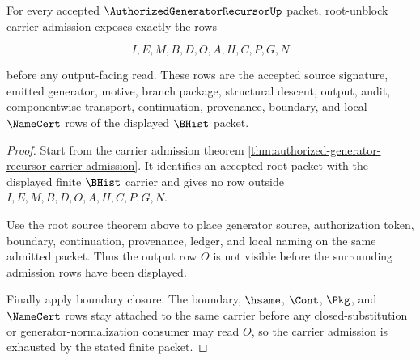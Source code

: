 \begin{theorem}
\label{thm:authorized-generator-recursor-root-unblock-carrier-admission}
For every accepted $\AuthorizedGeneratorRecursorUp$ packet, root-unblock carrier admission exposes exactly the rows

$$
I,E,M,B,D,O,A,H,C,P,G,N
$$

before any output-facing read. These rows are the accepted source signature, emitted generator, motive, branch package, structural descent, output, audit, componentwise transport, continuation, provenance, boundary, and local $\NameCert$ rows of the displayed $\BHist$ packet.
\end{theorem}
\begin{proof}
Start from the carrier admission theorem \autoref{thm:authorized-generator-recursor-carrier-admission}. It identifies an accepted root packet with the displayed finite $\BHist$ carrier and gives no row outside $I,E,M,B,D,O,A,H,C,P,G,N$.

Use the root source theorem above to place generator source, authorization token, boundary, continuation, provenance, ledger, and local naming on the same admitted packet. Thus the output row $O$ is not visible before the surrounding admission rows have been displayed.

Finally apply boundary closure. The boundary, $\hsame$, $\Cont$, $\Pkg$, and $\NameCert$ rows stay attached to the same carrier before any closed-substitution or generator-normalization consumer may read $O$, so the carrier admission is exhausted by the stated finite packet.
\end{proof}

